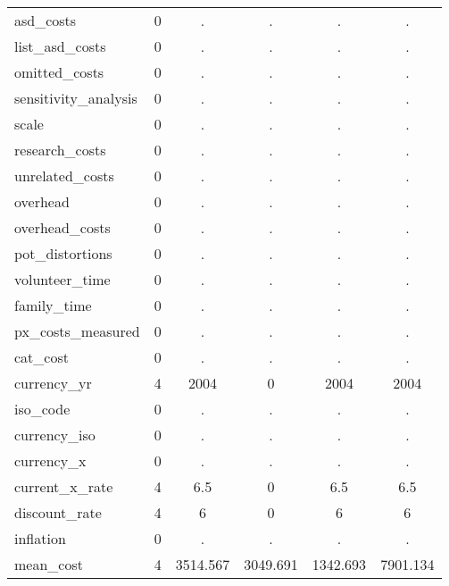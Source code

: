 \begin{table}[htbp]
\begin{tabular}{l*{1}{ccccc}}
asd\_costs   &           0&           .&           .&           .&           .\\
list\_asd\_costs&           0&           .&           .&           .&           .\\
omitted\_costs&           0&           .&           .&           .&           .\\
sensitivity\_analysis&           0&           .&           .&           .&           .\\
scale       &           0&           .&           .&           .&           .\\
research\_costs&           0&           .&           .&           .&           .\\
unrelated\_costs&           0&           .&           .&           .&           .\\
overhead    &           0&           .&           .&           .&           .\\
overhead\_costs&           0&           .&           .&           .&           .\\
pot\_distortions&           0&           .&           .&           .&           .\\
volunteer\_time&           0&           .&           .&           .&           .\\
family\_time &           0&           .&           .&           .&           .\\
px\_costs\_measured&           0&           .&           .&           .&           .\\
cat\_cost    &           0&           .&           .&           .&           .\\
currency\_yr &           4&        2004&           0&        2004&        2004\\
iso\_code    &           0&           .&           .&           .&           .\\
currency\_iso&           0&           .&           .&           .&           .\\
currency\_x  &           0&           .&           .&           .&           .\\
current\_x\_rate&           4&         6.5&           0&         6.5&         6.5\\
discount\_rate&           4&           6&           0&           6&           6\\
inflation   &           0&           .&           .&           .&           .\\
mean\_cost   &           4&    3514.567&    3049.691&    1342.693&    7901.134\\

\end{tabular}
\end{table}
